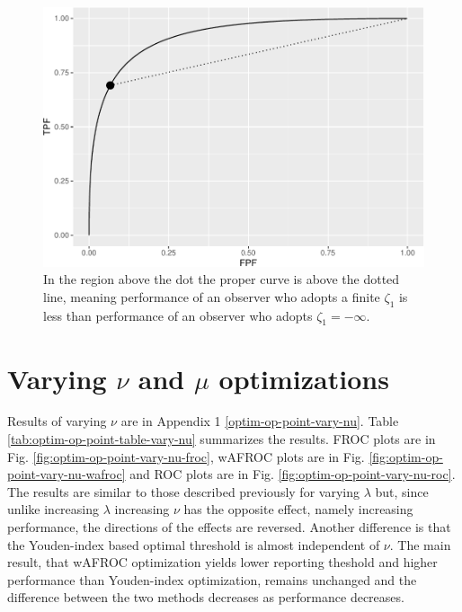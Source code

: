 \documentclass[
]{book}
\begin{document}
\begin{figure}
\centering
\includegraphics{21-optim-op-point_files/figure-latex/binormal-model-threshold-dependence-2-1.pdf}
\caption{\label{fig:binormal-model-threshold-dependence-2}In the region above the dot the proper curve is above the dotted line, meaning performance of an observer who adopts a finite \(\zeta_1\) is less than performance of an observer who adopts \(\zeta_1 = -\infty\).}
\end{figure}

\hypertarget{optim-op-point-vary-nu-mu}{%
\section{\texorpdfstring{Varying \(\nu\) and \(\mu\) optimizations}{Varying \textbackslash nu and \textbackslash mu optimizations}}\label{optim-op-point-vary-nu-mu}}

Results of varying \(\nu\) are in Appendix 1 \ref{optim-op-point-vary-nu}. Table \ref{tab:optim-op-point-table-vary-nu} summarizes the results. FROC plots are in Fig. \ref{fig:optim-op-point-vary-nu-froc}, wAFROC plots are in Fig. \ref{fig:optim-op-point-vary-nu-wafroc} and ROC plots are in Fig. \ref{fig:optim-op-point-vary-nu-roc}. The results are similar to those described previously for varying \(\lambda\) but, since unlike increasing \(\lambda\) increasing \(\nu\) has the opposite effect, namely increasing performance, the directions of the effects are reversed. Another difference is that the Youden-index based optimal threshold is almost independent of \(\nu\). The main result, that wAFROC optimization yields lower reporting theshold and higher performance than Youden-index optimization, remains unchanged and the difference between the two methods decreases as performance decreases.
\end{document}
